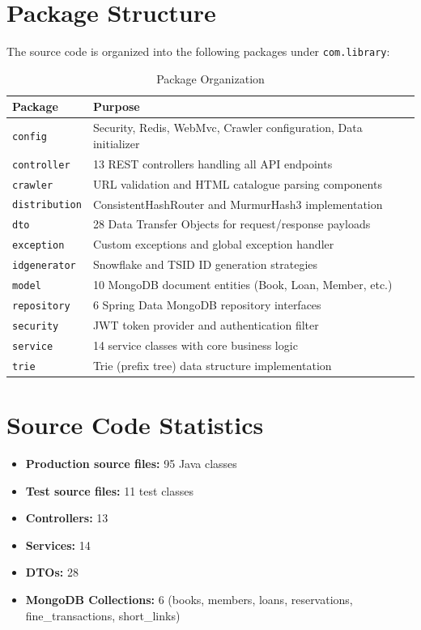 \documentclass[12pt,a4paper]{report}
\begin{document}
\section{Package Structure}
The source code is organized into the following packages under \texttt{com.library}:

\begin{table}[H]
\centering
\caption{Package Organization}
\begin{tabularx}{\textwidth}{l X}
\toprule
\textbf{Package} & \textbf{Purpose} \\
\midrule
\texttt{config} & Security, Redis, WebMvc, Crawler configuration, Data initializer \\
\texttt{controller} & 13 REST controllers handling all API endpoints \\
\texttt{crawler} & URL validation and HTML catalogue parsing components \\
\texttt{distribution} & ConsistentHashRouter and MurmurHash3 implementation \\
\texttt{dto} & 28 Data Transfer Objects for request/response payloads \\
\texttt{exception} & Custom exceptions and global exception handler \\
\texttt{idgenerator} & Snowflake and TSID ID generation strategies \\
\texttt{model} & 10 MongoDB document entities (Book, Loan, Member, etc.) \\
\texttt{repository} & 6 Spring Data MongoDB repository interfaces \\
\texttt{security} & JWT token provider and authentication filter \\
\texttt{service} & 14 service classes with core business logic \\
\texttt{trie} & Trie (prefix tree) data structure implementation \\
\bottomrule
\end{tabularx}
\end{table}

\section{Source Code Statistics}
\begin{itemize}[noitemsep]
    \item \textbf{Production source files:} 95 Java classes
    \item \textbf{Test source files:} 11 test classes
    \item \textbf{Controllers:} 13
    \item \textbf{Services:} 14
    \item \textbf{DTOs:} 28
    \item \textbf{MongoDB Collections:} 6 (books, members, loans, reservations, fine\_transactions, short\_links)
\end{itemize}
\end{document}
